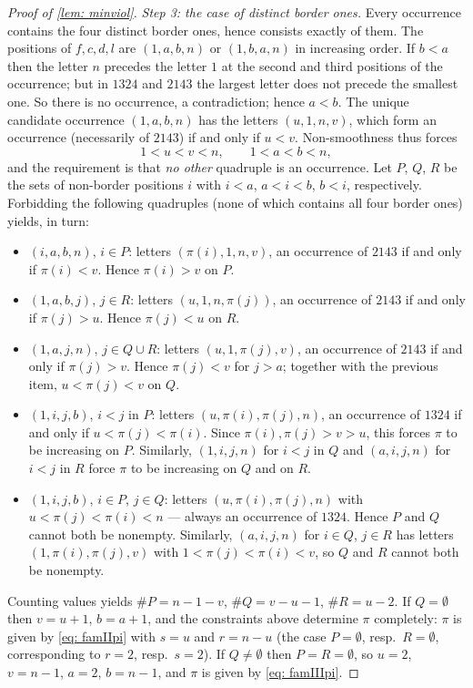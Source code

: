 \documentclass[10pt,a4paper]{amsart}
\begin{document}
\begin{proof}[Proof of \cref{lem: minviol}]
\emph{Step 3: the case of distinct border ones.}
Every occurrence contains the four distinct border ones, hence consists exactly of them. The positions of $f,c,d,l$
are $(1,a,b,n)$ or $(1,b,a,n)$ in increasing order. If $b<a$ then the letter $n$ precedes the letter $1$ at the
second and third positions of the occurrence; but in $1324$ and $2143$ the largest letter does not precede the
smallest one. So there is no occurrence, a contradiction; hence $a<b$. The unique candidate occurrence
$(1,a,b,n)$ has the letters $(u,1,n,v)$, which form an occurrence (necessarily of $2143$) if and only if $u<v$.
Non-smoothness thus forces
\[
1<u<v<n,\qquad 1<a<b<n,
\]
and the requirement is that \emph{no other} quadruple is an occurrence. Let
$P$, $Q$, $R$ be the sets of non-border positions $i$ with $i<a$, $a<i<b$, $b<i$, respectively.
Forbidding the following quadruples (none of which contains all four border ones) yields, in turn:
\begin{itemize}
\item $(i,a,b,n)$, $i\in P$: letters $(\pi(i),1,n,v)$, an occurrence of $2143$ if and only if $\pi(i)<v$.
Hence $\pi(i)>v$ on $P$.
\item $(1,a,b,j)$, $j\in R$: letters $(u,1,n,\pi(j))$, an occurrence of $2143$ if and only if $\pi(j)>u$.
Hence $\pi(j)<u$ on $R$.
\item $(1,a,j,n)$, $j\in Q\cup R$: letters $(u,1,\pi(j),v)$, an occurrence of $2143$ if and only if $\pi(j)>v$.
Hence $\pi(j)<v$ for $j>a$; together with the previous item, $u<\pi(j)<v$ on $Q$.
\item $(1,i,j,b)$, $i<j$ in $P$: letters $(u,\pi(i),\pi(j),n)$, an occurrence of $1324$ if and only if
$u<\pi(j)<\pi(i)$. Since $\pi(i),\pi(j)>v>u$, this forces $\pi$ to be increasing on $P$.
Similarly, $(1,i,j,n)$ for $i<j$ in $Q$ and $(a,i,j,n)$ for $i<j$ in $R$ force $\pi$ to be increasing on $Q$ and
on $R$.
\item $(1,i,j,b)$, $i\in P$, $j\in Q$: letters $(u,\pi(i),\pi(j),n)$ with $u<\pi(j)<\pi(i)<n$ --- always an
occurrence of $1324$. Hence $P$ and $Q$ cannot both be nonempty. Similarly, $(a,i,j,n)$ for $i\in Q$, $j\in R$
has letters $(1,\pi(i),\pi(j),v)$ with $1<\pi(j)<\pi(i)<v$, so $Q$ and $R$ cannot both be nonempty.
\end{itemize}
Counting values yields $\#P=n-1-v$, $\#Q=v-u-1$, $\#R=u-2$.
If $Q=\emptyset$ then $v=u+1$, $b=a+1$, and the constraints above determine $\pi$ completely:
$\pi$ is given by \cref{eq: famIIpi} with $s=u$ and $r=n-u$ (the case $P=\emptyset$, resp.\ $R=\emptyset$,
corresponding to $r=2$, resp.\ $s=2$). If $Q\ne\emptyset$ then $P=R=\emptyset$, so $u=2$, $v=n-1$, $a=2$, $b=n-1$,
and $\pi$ is given by \cref{eq: famIIIpi}.


\end{proof}
\end{document}
